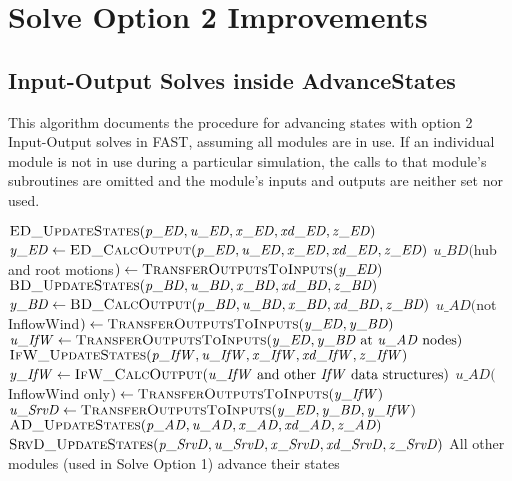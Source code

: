 \documentclass[10pt,letterpaper,oneside,notitlepage]{article}
\begin{document}
\pagebreak %
\section{Solve Option 2 Improvements}
\subsection {Input-Output Solves inside AdvanceStates}
This algorithm documents the procedure for advancing states with option 2 
Input-Output solves in FAST, assuming
all modules are in use. If an individual module is not in use during a particular
simulation, the calls to that module's subroutines are omitted and the module's 
inputs and outputs are neither set nor used.

\begin{algorithmic}[1]
\State $\Call{ED\_UpdateStates}{\mathit{p\_ED},\mathit{u\_ED},\mathit{x\_ED},\mathit{xd\_ED},\mathit{z\_ED}}$
\State $\mathit{y\_ED} \gets \Call{ED\_CalcOutput}{\mathit{p\_ED},\mathit{u\_ED},\mathit{x\_ED},\mathit{xd\_ED},\mathit{z\_ED}}$
\State
\State $\mathit{u\_BD}($hub and root motions$) \gets \Call{TransferOutputsToInputs}{\mathit{y\_ED}}$
\State $\Call{BD\_UpdateStates}{\mathit{p\_BD},\mathit{u\_BD},\mathit{x\_BD},\mathit{xd\_BD},\mathit{z\_BD}}$
\State $\mathit{y\_BD} \gets \Call{BD\_CalcOutput}{\mathit{p\_BD},\mathit{u\_BD},\mathit{x\_BD},\mathit{xd\_BD},\mathit{z\_BD}}$
\State
\State $\mathit{u\_AD}($not InflowWind$) \gets \Call{TransferOutputsToInputs}{\mathit{y\_ED},\mathit{y\_BD}}$
\State $\mathit{u\_IfW} \gets \Call{TransferOutputsToInputs}{\mathit{y\_ED},\mathit{y\_BD}$ at $\mathit{u\_AD}$ nodes$}$
\State $\Call{IfW\_UpdateStates}{\mathit{p\_IfW},\mathit{u\_IfW},\mathit{x\_IfW},\mathit{xd\_IfW},\mathit{z\_IfW}}$
\State $\mathit{y\_IfW} \gets \Call{IfW\_CalcOutput}{\mathit{u\_IfW}$ and other $\mathit{IfW}$ data structures$}$
\State
\State $\mathit{u\_AD}($InflowWind only$) \gets \Call{TransferOutputsToInputs}{\mathit{y\_IfW}}$
\State $\mathit{u\_SrvD} \gets \Call{TransferOutputsToInputs}{\mathit{y\_ED},\mathit{y\_BD},\mathit{y\_IfW}}$
\State $\Call{AD\_UpdateStates}{\mathit{p\_AD},\mathit{u\_AD},\mathit{x\_AD},\mathit{xd\_AD},\mathit{z\_AD}}$
\State $\Call{SrvD\_UpdateStates}{\mathit{p\_SrvD},\mathit{u\_SrvD},\mathit{x\_SrvD},\mathit{xd\_SrvD},\mathit{z\_SrvD}}$
\State
\State All other modules (used in Solve Option 1) advance their states
\EndProcedure
\end{algorithmic}
\end{document}
